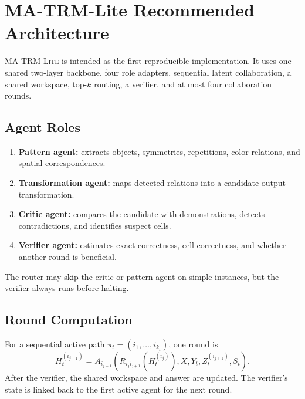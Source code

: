 \documentclass[10pt,a4paper,twocolumn]{article}
\newcommand{\MALite}{\textsc{MA-TRM-Lite}}
\begin{document}
\section{MA-TRM-Lite Recommended Architecture}
\MALite{} is intended as the first reproducible implementation. It uses one shared two-layer backbone, four role adapters, sequential latent collaboration, a shared workspace, top-$k$ routing, a verifier, and at most four collaboration rounds.

\subsection{Agent Roles}
\begin{enumerate}[label=\textbf{A\arabic*.}]
\item \textbf{Pattern agent:} extracts objects, symmetries, repetitions, color relations, and spatial correspondences.
\item \textbf{Transformation agent:} maps detected relations into a candidate output transformation.
\item \textbf{Critic agent:} compares the candidate with demonstrations, detects contradictions, and identifies suspect cells.
\item \textbf{Verifier agent:} estimates exact correctness, cell correctness, and whether another round is beneficial.
\end{enumerate}
The router may skip the critic or pattern agent on simple instances, but the verifier always runs before halting.

\subsection{Round Computation}
For a sequential active path $\pi_t=(i_1,\ldots,i_{k_t})$, one round is
\begin{equation}
H_t^{(i_{j+1})}=A_{i_{j+1}}\!\left(R_{i_j i_{j+1}}(H_t^{(i_j)}),X,Y_t,Z_t^{(i_{j+1})},S_t\right). \label{eq:lite_round}
\end{equation}
After the verifier, the shared workspace and answer are updated. The verifier's state is linked back to the first active agent for the next round.
\end{document}
